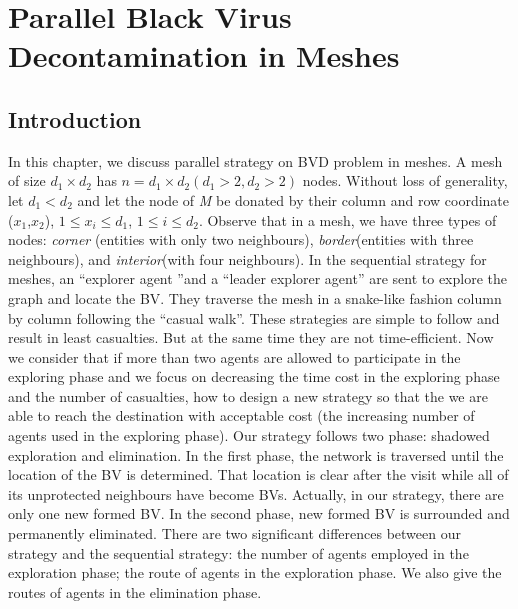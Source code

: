\chapter {Parallel Black Virus Decontamination in Meshes}
\label{DL}
 
\section{Introduction}
In this chapter, we discuss parallel strategy on BVD problem in meshes. A mesh of size $d_1\times d_2$ has $n=d_1\times d_2(d_1>2,d_2>2)$ nodes. Without loss of generality, let $d_1<d_2$ and let the node of {\em M} be donated by their column and row coordinate ($x_1$,$x_2$), $1\leq x_i \leq d_1$, $1\leq i \leq d_2$. Observe that in a mesh, we have three types of nodes: \textit{corner} (entities with only two neighbours), \textit{border}(entities with three neighbours), and \textit{interior}(with four neighbours). In the sequential strategy for meshes, an ``explorer agent ''and a ``leader explorer agent'' are sent to explore the graph and locate the BV. They traverse the mesh in a snake-like fashion column by column following the ``casual walk''. These strategies are simple to follow and result in least casualties. But at the same time they are not time-efficient. Now we consider that if more than two agents are allowed to participate in the exploring phase and we focus on decreasing the time cost in the exploring phase and the number of casualties, how to design a new strategy so that the we are able to reach the destination with acceptable cost (the increasing number of agents used in the exploring phase). Our strategy follows two phase: shadowed exploration and elimination. In the first phase, the network is traversed until the location of the BV is determined. That location is clear after the visit while all of its unprotected neighbours have become BVs. Actually, in our strategy, there are only one new formed BV. In the second phase, new formed BV is surrounded and permanently eliminated. There are two significant differences between our strategy and the sequential strategy: the number of agents employed in the exploration phase; the route of agents in the exploration phase. We also give the routes of agents in the elimination phase. 
